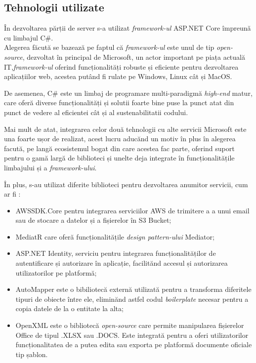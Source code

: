	
 

\subsection*{Tehnologii utilizate}
În dezvoltarea părții de server s-a utilizat \textit{framework-ul } ASP.NET Core împreună cu limbajul C\#.\\
Alegerea făcută se bazează pe faptul că \textit{framework-ul} este unul de tip \textit{open-source}, dezvoltat în principal de Microsoft, un actor important pe piața actuală IT,\textit{framework-ul} oferind funcționalități robuste și eficiente pentru dezvoltarea aplicațiilor web, acestea putând fi rulate pe Windows, Linux cât și MacOS.

De asemenea, C\# este un limbaj de programare multi-paradigmă \textit{high-end} matur, care oferă diverse funcționalități și solutii foarte bine puse la punct atat din punct de vedere al eficientei cât și al sustenabilitatii codului.

Mai mult de atat, integrarea celor două tehnologii cu alte servicii Microsoft este una foarte ușor de realizat, acest lucru aducănd un motiv în plus în alegerea facută, pe langă ecosistemul bogat din care acestea fac parte, oferind suport pentru o gamă largă de biblioteci și unelte deja integrate în funcționalitățile limbajului și a \textit{framework-ului}.

În plus, s-au utilizat diferite biblioteci pentru dezvoltarea anumitor servicii, cum ar fi :
\begin{itemize}
	\item  AWSSDK.Core pentru integrarea serviciilor AWS de trimitere a a unui email sau de stocare a datelor și a fișierelor în S3 Bucket;
	
	\item  MediatR care oferă funcționalitățile \textit{design pattern-ului} Mediator;
	
	\item ASP.NET Identity, serviciu pentru integrarea funcționalităților de autentificare și autorizare în aplicație, facilitănd accesul și autorizarea utilizatorilor pe platformă;
	
	
	\item AutoMapper este o bibiliotecă externă utilizată pentru a transforma diferitele tipuri de obiecte între ele, eliminănd astfel codul \textit{boilerplate} necesar pentru a copia datele de la o entitate la alta;
	
	\item OpenXML este o bibliotecă \textit{open-source} care permite manipularea fișierelor Office de tipul .XLSX sau .DOCS. Este integrată pentru a oferi utilizatorilor funcționalitatea de a putea edita sau exporta pe platformă documente oficiale tip șablon.
	
\end{itemize}
   


